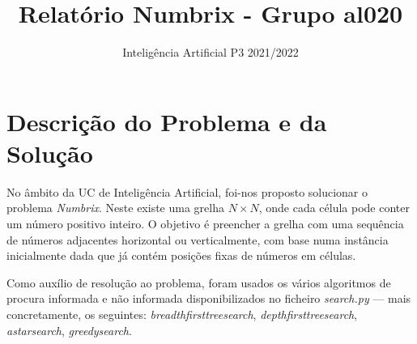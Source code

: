 \documentclass[12pt]{exam}
\title{Relatório Numbrix - Grupo al020}
\author{Inteligência Artificial P3 2021/2022}
\date{}
\renewcommand\_{\textunderscore\linebreak[1]}
\begin{document}
    \maketitle
    \vspace{-3.5em}
    \section{Descrição do Problema e da Solução}
        \indent No âmbito da UC de Inteligência Artificial, foi-nos proposto solucionar o problema \textit{Numbrix}.
        Neste existe uma grelha \textbf{$N\times N$}, onde cada célula pode conter um número positivo inteiro.
        O objetivo é preencher a grelha com uma sequência de números adjacentes horizontal ou verticalmente, com base numa instância inicialmente
        dada que já contém posições fixas de números em células.

        \indent Como auxílio de resolução ao problema, foram usados os vários algoritmos de procura informada e não informada disponibilizados no ficheiro \textit{search.py} — mais concretamente, os seguintes: \textit{breadth\_first\_tree\_search}, \textit{depth\_first\_tree\_search}, \textit{astar\_search}, \textit{greedy\_search}.
\end{document}
